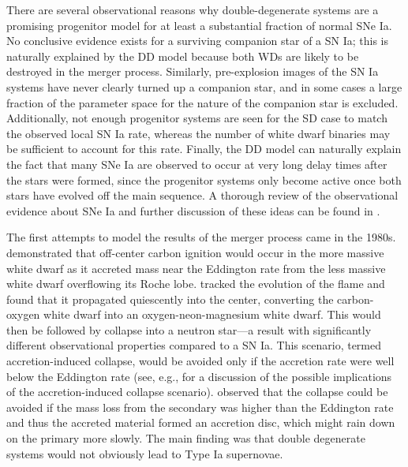 \documentclass[12pt]{article}
\begin{document}
There are several observational reasons why double-degenerate systems
are a promising progenitor model for at least a substantial fraction
of normal SNe Ia. No conclusive evidence exists for a surviving
companion star of a SN Ia; this is naturally explained by the DD model
because both WDs are likely to be destroyed in the merger
process. Similarly, pre-explosion images of the SN Ia systems have
never clearly turned up a companion star, and in some cases a large
fraction of the parameter space for the nature of the companion star
is excluded. Additionally, not enough progenitor systems are seen for
the SD case to match the observed local SN Ia rate, whereas the number
of white dwarf binaries may be sufficient to account for this
rate. Finally, the DD model can naturally explain the fact that many
SNe Ia are observed to occur at very long delay times after the stars
were formed, since the progenitor systems only become active once both
stars have evolved off the main sequence. A thorough review of the
observational evidence about SNe Ia and further discussion of these
ideas can be found in \cite{maoz:2014}.

The first attempts to model the results of the merger process came in the
1980s. \cite{nomotoiben:1985} demonstrated that off-center carbon
ignition would occur in the more massive white dwarf as it accreted
mass near the Eddington rate from the less massive white dwarf
overflowing its Roche lobe. \cite{saionomoto:1985} tracked the
evolution of the flame and found that it propagated quiescently into
the center, converting the carbon-oxygen white dwarf into an
oxygen-neon-magnesium white dwarf. This would then be followed by
collapse into a neutron star---a result with significantly different
observational properties compared to a SN Ia. This scenario, termed
accretion-induced collapse, would be avoided only if the accretion
rate were well below the Eddington rate (see, e.g., \cite{fryer:1999}
for a discussion of the possible implications of the accretion-induced 
collapse scenario). \cite{tutukov-yungelson:1979}
observed that the collapse could be avoided if the mass loss from the secondary
was higher than the Eddington rate and thus the accreted material
formed an accretion disc, which might rain down on the primary more
slowly. The main finding was that double degenerate systems would not
obviously lead to Type Ia supernovae.
\end{document}
